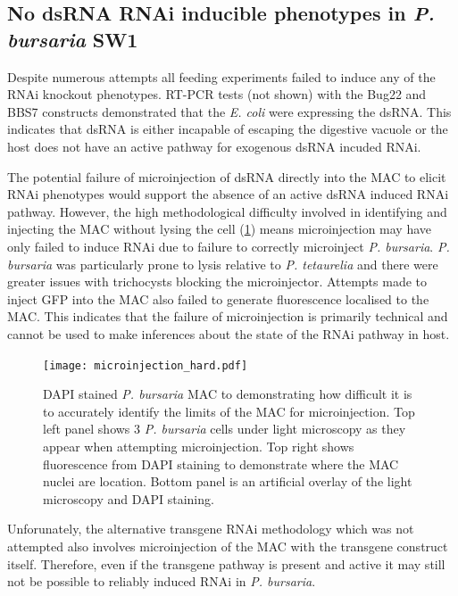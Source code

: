 \subsection{No dsRNA RNAi inducible phenotypes in \textit{P. bursaria} SW1}

Despite numerous attempts all feeding experiments failed to induce
any of the RNAi knockout phenotypes.  RT-PCR tests (not shown) with the Bug22
and BBS7 constructs demonstrated
that the \textit{E. coli} were expressing the dsRNA.  
This indicates that dsRNA is either incapable of escaping the digestive vacuole
or the host does not have an active pathway for exogenous dsRNA incuded
RNAi.  

The potential failure of microinjection of dsRNA directly into the MAC
to elicit RNAi phenotypes would support the absence
of an active dsRNA induced RNAi pathway. 
However, the high methodological difficulty involved in identifying and injecting
the MAC without lysing the cell (\cref{fig:microinjection_nucleus}) 
means microinjection may have only failed to induce RNAi due to failure
to correctly microinject \textit{P. bursaria}.   \textit{P. bursaria}
was particularly prone to lysis relative to \textit{P. tetaurelia} and
there were greater issues with trichocysts blocking the microinjector. 
Attempts made to inject GFP into the MAC also failed to generate fluorescence
localised to the MAC.  This indicates that the failure of microinjection is
primarily technical and cannot be used to make inferences about the state
of the RNAi pathway in host. 

\begin{figure}
    \centering
    \texttt{[image: microinjection\_hard.pdf]}
    \caption[DAPI Stained \textit{P. bursaria} MAC]{
        DAPI stained \textit{P. bursaria}
        MAC to demonstrating how difficult it is to accurately identify the limits
        of the MAC for microinjection.  Top left panel shows 3 \textit{P. bursaria}
    cells under light microscopy as they appear when attempting
microinjection. Top right shows fluorescence from DAPI staining to demonstrate
where the MAC nuclei are location.  Bottom panel is an artificial overlay
of the light microscopy and DAPI staining.}
    \label{fig:microinjection_nucleus}
\end{figure}

Unforunately, the alternative transgene RNAi methodology \citep{Galvani2001} 
which was not attempted also involves microinjection of the MAC with
the transgene construct itself.  Therefore, even if the transgene
pathway is present and active it may still not be possible to reliably
induced RNAi in \textit{P. bursaria}.

